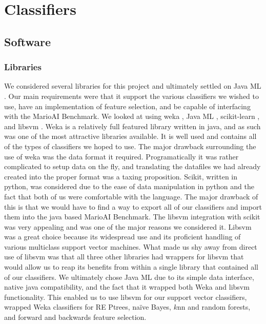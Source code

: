 \documentclass[]{article}   %
\begin{document}
\section{Classifiers}
\label{sec:class}
\subsection{Software}
\subsubsection{Libraries}
We considered several libraries for this project and ultimately settled on Java ML \cite{javaml}. Our main 
requirements were that it support the various classifiers we wished to use, have an implementation of feature 
selection, and be capable of interfacing with the MarioAI Benchmark. We looked at using weka \cite{weka}, Java ML \cite{javaml}, scikit-learn 
\cite{scikit}, and libsvm \cite{libsvm}. 
\newline\newline
Weka is a relatively full featured library written in java, and as such was one of the most attractive libraries 
available. It is well used and contains all of the types of classifiers we hoped to use. The major drawback 
surrounding the use of weka was the data format it required. Programatically it was rather complicated to setup 
data on the fly, and translating the datafiles we had already created into the proper format was a taxing proposition. 
\newline\newline
Scikit, written in python, was considered due to the ease of data manipulation in python and the fact that both 
of us were comfortable with the language. The major drawback of this is that we would have to find a way to 
export all of our classifiers and import them into the java based MarioAI Benchmark. The libsvm 
integration with scikit was very appealing and was one of the major reasons we considered it.
\newline\newline
Libsvm was a great choice because its widespread use and its proficient handling of various multiclass support 
vector machines. What made us shy away from direct use of libsvm was that all three other libraries had wrappers 
for libsvm that would allow us to reap its benefits from within a single library that contained all of our classifiers.
\newline\newline
We ultimately chose Java ML due to its simple data interface, native java compatibility, and the fact that it 
wrapped both Weka and libsvm functionality. This enabled us to use libsvm for our support vector classifiers, 
wrapped Weka classifiers for RE Ptrees, na\"{i}ve Bayes, $k$nn and random forests, and forward and backwards feature 
selection. 
\end{document}
